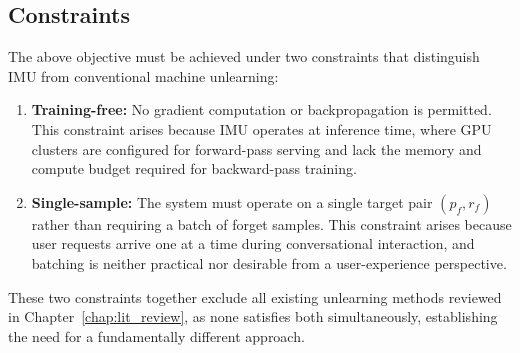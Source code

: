 \subsection{Constraints}\label{subsec:repair_constraints}

The above objective must be achieved under two constraints that distinguish IMU from conventional machine unlearning:

\begin{enumerate}
    \item \textbf{Training-free:} No gradient computation or backpropagation is permitted. This constraint arises because IMU operates at inference time, where GPU clusters are configured for forward-pass serving and lack the memory and compute budget required for backward-pass training.

    \item \textbf{Single-sample:} The system must operate on a single target pair $(p_f, r_f)$ rather than requiring a batch of forget samples. This constraint arises because user requests arrive one at a time during conversational interaction, and batching is neither practical nor desirable from a user-experience perspective.
\end{enumerate}

These two constraints together exclude all existing unlearning methods reviewed in Chapter~\ref{chap:lit_review}, as none satisfies both simultaneously, establishing the need for a fundamentally different approach.